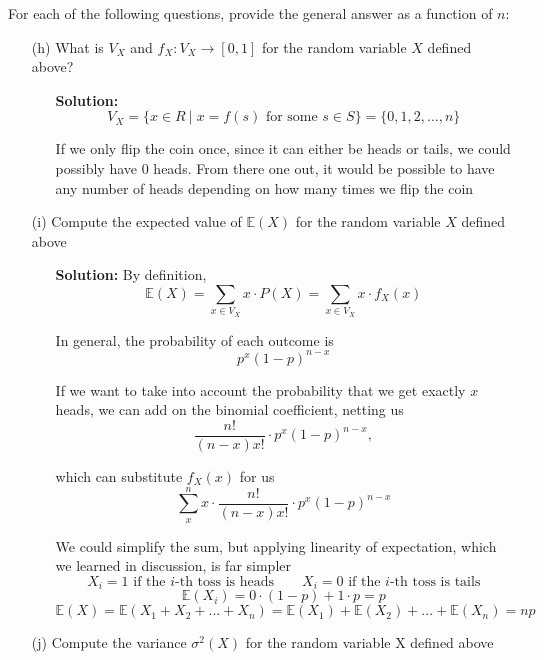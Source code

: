 \documentclass[hidelinks]{article}
\begin{document}
For each of the following questions, provide the general answer as a function of $n$:
    \begin{itemize}
    \item[(h)] What is $V_X$ and $f_X : V_X \rightarrow [0, 1]$ for the random variable $X$ defined above? 
   \begin{itemize}
       \item[ ] \textbf{Solution: } 
           \[
               V_X = \{x \in R\ | \; x= f(s) \text{ for some }s \in S \} = \{
                0, 1, 2, ... ,n
               \}
           \]
        \item[ ] If we only flip the coin once, since it can either be heads or tails, we could possibly have 0 heads. From there one out, it would be possible to have any number of heads depending on how many times we flip the coin
    \end{itemize}
    \item[(i)] Compute the expected value of $\mathbb{E}(X)$ for the random variable $X$ defined above 
   \begin{itemize}
       \item[ ] \textbf{Solution: }By definition, 
           \[
               \mathbb{E}(X) = \sum_{x \in V_X} x \cdot P(X) = \sum_{x \in V_X} x \cdot f_X(x)
           \]
        \item[ ] In general, the probability of each outcome is 
        \[
            p^x (1-p)^{n - x}
        \]
    \item[ ] If we want to take into account the probability that we get exactly $x$ heads, we can add on the binomial coefficient, netting us 
        \[
            \frac{n!}{(n-x)x!}\cdot  p^x (1-p)^{n - x}, 
        \]
    \item[] which can substitute $f_X(x)$ for us
        \[
            \sum_{x}^n x \cdot \frac{n!}{(n-x)x!}\cdot  p^x (1-p)^{n - x} 
        \]
    \item[ ] We could simplify the sum, but applying linearity of expectation, which we learned in discussion, is far simpler
    \[
        X_i = 1 \text{ if the $i$-th toss is heads} \quad \quad
        X_i = 0 \text{ if the $i$-th toss is tails} 
    \]
    \[
        \mathbb{E}(X_i) = 0\cdot(1 - p) + 1 \cdot p = p
    \]
    \[
        \mathbb{E}(X) = \mathbb{E}(X_1 + X_2 + ... + X_n) = \mathbb{E}(X_1) + \mathbb{E}(X_2) + ... + \mathbb{E}(X_n) = np
    \]
    \end{itemize}
    \item[(j)] Compute the variance $\sigma^2(X)$ for the random variable X defined above

\end{itemize}
\end{document}
